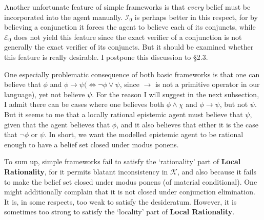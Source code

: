 \documentclass[12pt]{article}
\newcommand{\K}{\mathcal{K}}
\begin{document}
\par
Another unfortunate feature of simple frameworks is that \textit{every} belief must be incorporated into the agent manually. $\mathcal{I}_0$ is perhaps better in this respect, for by believing a conjunction it forces the agent to believe each of its conjuncts, while $\mathcal{E}_0$ does not yield this feature since the exact verifier of a conjunction is not generally the exact verifier of its conjuncts. But it should be examined whether this feature is really desirable. I postpone this discussion to \S 2.3.
\par
One especially problematic consequence of both basic frameworks is that one can believe that $\phi$ and $\phi \rightarrow \psi (\iff \lnot \phi \lor \psi$, since $\rightarrow$ is not a primitive operator in our language), yet not believe $\psi$. For the reason I will suggest in the next subsection, I admit there can be cases where one believes both $\phi \land \chi$ and $\phi \rightarrow \psi$, but not $\psi$. But it seems to me that a locally rational epistemic agent must believe that $\psi$, given that the agent believes that $\phi$, and it also believes that either it is the case that $\lnot \phi$ or $\psi$. In short, we want the modelled epistemic agent to be rational enough to have a belief set closed under modus ponens. 
\par
To sum up, simple frameworks fail to satisfy the `rationality' part of \textbf{Local Rationality}, for it permits blatant inconsistency in $\K$, and also because it fails to make the belief set closed under modus ponens (of material conditional). One might additionally complain that it is not closed under conjunction elimination. It is, in some respects, too weak to satisfy the desideratum. However, it is sometimes too strong to satisfy the `locality' part of \textbf{Local Rationality}. 
\end{document}

